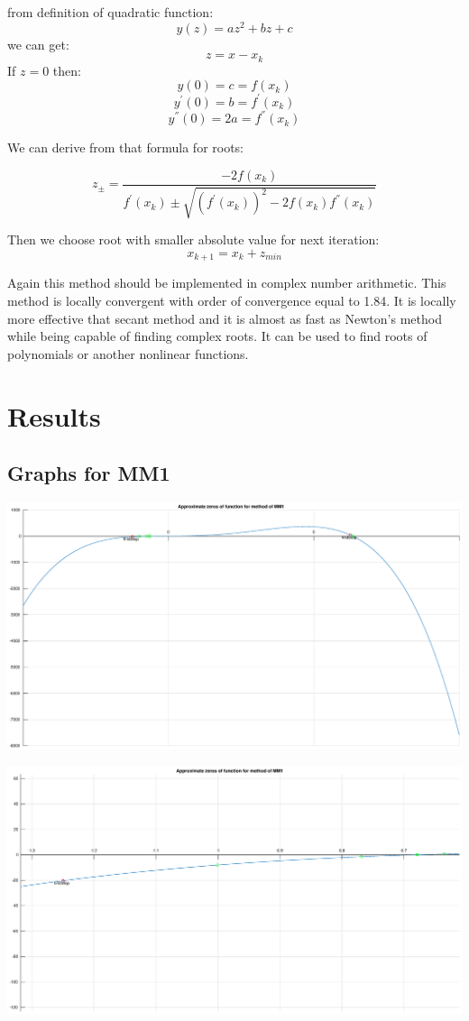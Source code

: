 \documentclass[12pt]{report}
\begin{document}
from definition of quadratic function:
\[ y(z) = az^2 + bz + c \]
we can get:
\[ z = x - x_k \]
If $z = 0$ then:
\[ y(0) = c = f(x_k) \]
\[ y^{'}(0) = b = f^{'}(x_k) \]
\[ y^{''}(0) = 2a = f^{''}(x_k) \]

We can derive from that formula for roots:

\[ z_{\pm} = \frac{-2f(x_k)}{f^{'}(x_k) \pm \sqrt{ (f^{'}(x_k))^2 - 2f(x_k)f^{''}(x_k)}}\]

Then we choose root with smaller absolute value for next iteration:
\[ x_{k+1} = x_k + z_{min} \]

Again this method should be implemented in complex number arithmetic.
This method is locally convergent with order of convergence equal to 1.84. It is locally more effective that secant method and it is almost as fast as Newton's method while being capable of finding complex roots. It can be used to find roots of polynomials or another nonlinear functions.

\section{Results}

\subsection{Graphs for MM1}
\begin{center}
   \includegraphics[scale=0.25]{task2mm1overall.eps}
\end{center}

\begin{center}
   \includegraphics[scale=0.25]{task2mm1zommedleft.eps}
\end{center}
\end{document}
